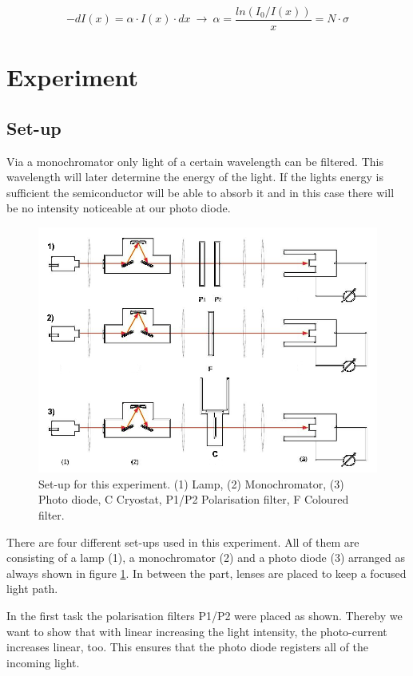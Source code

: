 \documentclass[]{article}
\begin{document}
\begin{equation}
-dI(x) = \alpha \cdot I(x)\cdot dx\ \rightarrow\ \alpha=\frac{ln(I_0 / I(x))}{x} = N\cdot \sigma
\end{equation}


\section{Experiment}
\subsection{Set-up}
Via a monochromator only light of a certain wavelength can be filtered. This wavelength will later determine the energy of the light. If the lights energy is sufficient the semiconductor will be able to absorb it and in this case there will be no intensity noticeable at our photo diode. 

\begin{figure}[H]
\centering
\includegraphics[width=.9\textwidth]{Plots/setup.png}
\caption{Set-up for this experiment. (1) Lamp, (2) Monochromator, (3) Photo diode, C Cryostat, P1/P2 Polarisation filter, F Coloured filter. }
\label{fig:setup}
\end{figure}

There are four different set-ups used in this experiment. All of them are consisting of a lamp (1), a monochromator (2) and a photo diode (3) arranged as always shown in figure \ref{fig:setup}. In between the part, lenses are placed to keep a focused light path.

In the first task the polarisation filters P1/P2 were placed as shown. Thereby we want to show that with linear increasing the light intensity, the photo-current increases linear, too. This ensures that the photo diode registers all of the incoming light.
\end{document}
